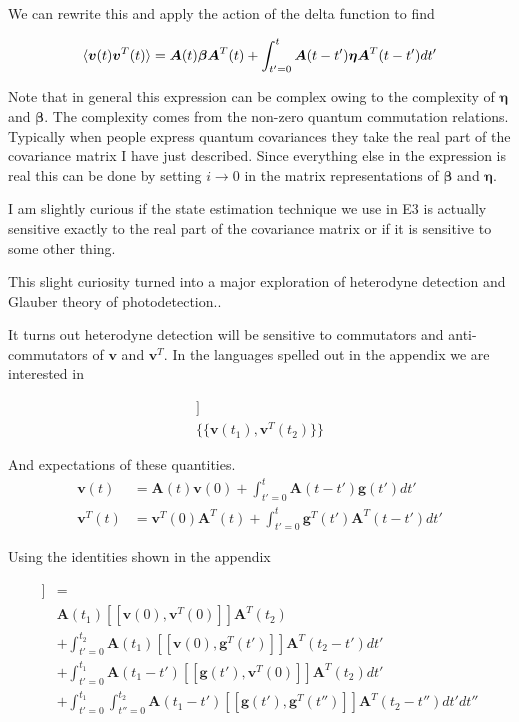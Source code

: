 \documentclass[12pt]{article}
\newcommand{\bv}[1]{\boldsymbol{#1}}
\begin{document}
We can rewrite this and apply the action of the delta function to find

\begin{equation}
\braket{\bv{v}(t)\bv{v}^T(t)} = \bv{A}(t) \bv{\beta} \bv{A}^T(t) + \int_{t'=0}^t \bv{A}(t-t') \bv{\eta} \bv{A}^T(t-t') dt'
\end{equation}

Note that in general this expression can be complex owing to the complexity of $\bv{\eta}$ and $\bv{\beta}$. The complexity comes from the non-zero quantum commutation relations. Typically when people express quantum covariances they take the real part of the covariance matrix I have just described. Since everything else in the expression is real this can be done by setting $i\rightarrow 0$ in the matrix representations of $\bv{\beta}$ and $\bv{\eta}$.

I am slightly curious if the state estimation technique we use in E3 is actually sensitive exactly to the real part of the covariance matrix or if it is sensitive to some other thing.

This slight curiosity turned into a major exploration of heterodyne detection and  Glauber theory of photodetection..

It turns out heterodyne detection will be sensitive to commutators and anti-commutators of $\bv{v}$ and $\bv{v}^T$. In the languages spelled out in the appendix we are interested in

\begin{align}
[[\bv{v}(t_1),\bv{v}^T(t_2)]]\\
\{\{\bv{v}(t_1),\bv{v}^T(t_2)\}\}
\end{align}

And expectations of these quantities. 
\begin{align}
\bv{v}(t) &= \bv{A}(t) \bv{v}(0) + \int_{t'=0}^t \bv{A}(t-t') \bv{g}(t') dt'\\
\bv{v}^T(t) &=  \bv{v}^T(0)\bv{A}^T(t) + \int_{t'=0}^t \bv{g}^T(t')\bv{A}^T(t-t')  dt'
\end{align}

Using the identities shown in the appendix

\begin{align}
[[\bv{v}(t_1),\bv{v}^T(t_2)]]&= \\
&\bv{A}(t_1)[[\bv{v}(0),\bv{v}^T(0)]]\bv{A}^T(t_2)\\
&+\int_{t'=0}^{t_2} \bv{A}(t_1) [[\bv{v}(0),\bv{g}^T(t')]] \bv{A}^T(t_2-t') dt'\\
&+\int_{t'=0}^{t_1}\bv{A}(t_1-t')[[\bv{g}(t'),\bv{v}^T(0)]] \bv{A}^T(t_2) dt'\\
&+\int_{t'=0}^{t_1}\int_{t''=0}^{t_2} \bv{A}(t_1-t')[[\bv{g}(t'),\bv{g}^T(t'')]]\bv{A}^T(t_2-t'') dt' dt''
\end{align}
\end{document}

